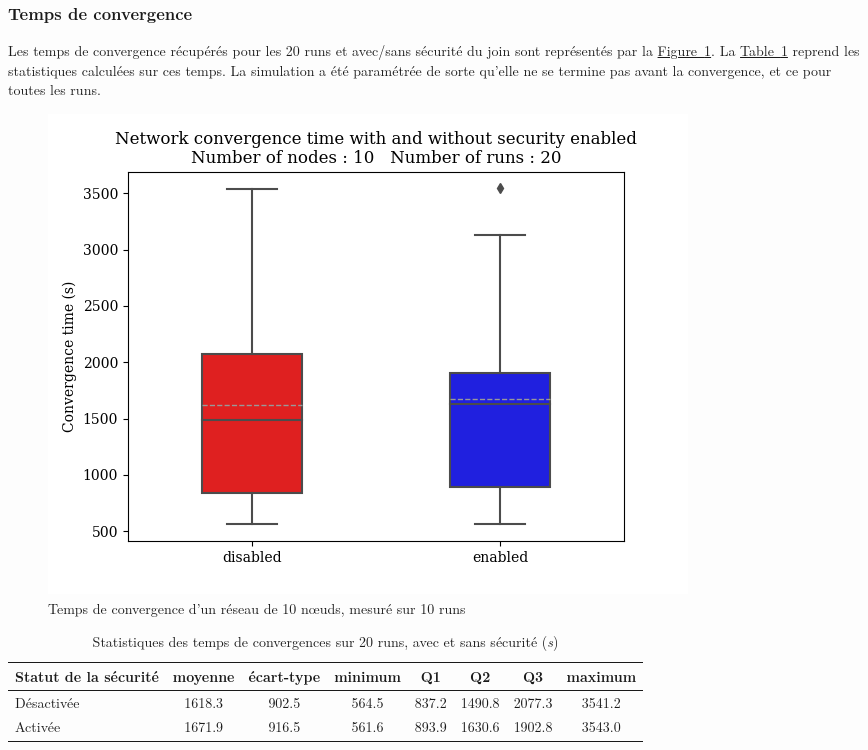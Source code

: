 \documentclass[]{report}
\newcommand{\wordlink}[2]{\hyperref[#2]{#1~\ref{#2}}}
\begin{document}
\subsubsection{Temps de convergence}

Les temps de convergence récupérés pour les 20 runs et avec/sans sécurité du join sont représentés par la \wordlink{Figure}{fig:convergence}. La \wordlink{Table}{table_convergence} reprend les statistiques calculées sur ces temps. La simulation a été paramétrée de sorte qu'elle ne se termine pas avant la convergence, et ce pour toutes les runs.

	\begin{figure}[!h]
	\centering
	\includegraphics[width=0.7\linewidth]{results/secjoin/boxesTimeConvergence20.png}
	\caption{Temps de convergence d'un réseau de 10 nœuds, mesuré sur 10 runs}
	\label{fig:convergence}
	\end{figure}

\vspace{0.1cm}

\begin{table}[h]
\centering
\begin{tabular}{|l|c|c|c|c|c|c|c|}
	\hline
    \textbf{\textbf{Statut de la sécurité}} & moyenne & écart-type & minimum & Q1 & Q2 & Q3 & maximum\\
    \hline
    Désactivée & 1618.3 & 902.5 & 564.5 & 837.2 & 1490.8 & 2077.3 & 3541.2 \\
    \hline
    Activée & 1671.9 & 916.5 & 561.6 & 893.9 & 1630.6 & 1902.8 & 3543.0 \\
    \hline
\end{tabular}
\caption{Statistiques des temps de convergences sur 20 runs, avec et sans sécurité (\textit{s})}
\label{table_convergence}
\end{table}

\newpage
\end{document}
